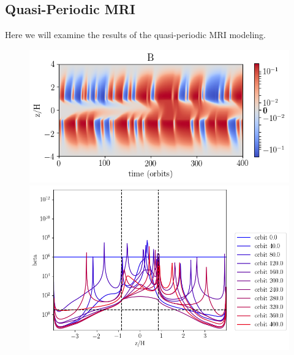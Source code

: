 


\subsection{Quasi-Periodic MRI}
Here we will examine the results of the quasi-periodic MRI modeling.  

\begin{figure}[h!]
\centering
\includegraphics[width=0.6\columnwidth]{figs/figsChapter5/noSC_AD_randomMRI/B_ST2.png}
\includegraphics[width=0.8\columnwidth]{figs/figsChapter5/noSC_AD_randomMRI/beta.png}
\caption{ }
\label{1dModel}
\end{figure}





